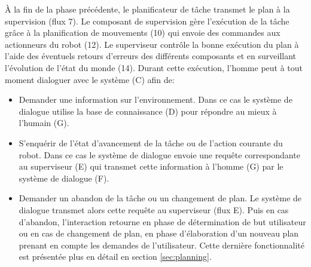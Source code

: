 \documentclass[a4paper,11pt,twoside]{StyleThese}
\begin{document}
À la fin de la phase précédente, le planificateur de tâche transmet le plan à la supervision (flux 7). Le composant de supervision gère l'exécution de la tâche grâce à la planification de mouvements (10) qui envoie des commandes aux actionneurs du robot (12). Le superviseur contrôle la bonne exécution du plan à l'aide des éventuels retours d'erreurs des différents composants et en surveillant l'évolution de l'état du monde (14). Durant cette exécution, l'homme peut à tout moment dialoguer avec le système (C) afin de:
\begin{itemize}
\item Demander une information sur l'environnement. Dans ce cas le système de dialogue utilise la base de connaissance (D) pour répondre au mieux à l'humain (G).
\item S'enquérir de l'état d'avancement de la tâche ou de l'action courante du robot. Dans ce cas le système de dialogue envoie une requête correspondante au superviseur (E) qui transmet cette information à l'homme (G) par le système de dialogue (F).
\item Demander un abandon de la tâche ou un changement de plan. Le système de dialogue transmet alors cette requête au superviseur (flux E). Puis en cas d'abandon, l'interaction retourne en phase de détermination de but utilisateur ou en cas de changement de plan, en phase d'élaboration d'un nouveau plan prenant en compte les demandes de l'utilisateur. Cette dernière fonctionnalité est présentée plus en détail en section \ref{sec:planning}.
\end{itemize}

\end{document}
